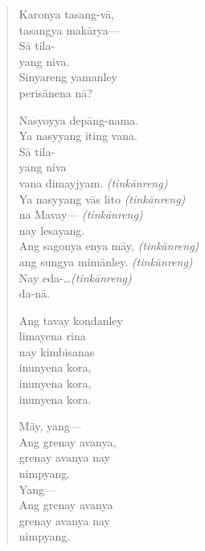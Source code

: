 \documentclass[12pt,paper=a4]{scrartcl}
\begin{document}
\begin{quote}
\begin{multicols}{2}
Karonya tasang-vā,\\
tasangya makārya---\\
Sā tila-\\
yang niva.\\
Sinyareng yamanley\\
perisānena nā?

Nasyoyya depāng-nama.\\
Ya nasyyang iting vana.\\
Sā tila-\\
yang niva\\
vana dimayjyam.			\tab \textit{(tinkānreng)}\\
Ya nasyyang vās lito	\tab \textit{(tinkānreng)}\\
na Mavay---				\tab \textit{(tinkānreng)}\\
nay lesayang.\\
Ang sagonya enya māy,	\tab \textit{(tinkānreng)}\\
ang sungya mimānley.	\tab \textit{(tinkānreng)}\\
Nay eda-\dots			\tab \textit{(tinkānreng)}\\
da-nā.

\columnbreak

Ang tavay kondanley\\
limayena rina\\
nay kimbisanas\\
inunyena kora,\\
inunyena kora,\\
inunyena kora.

Māy, yang---\\
Ang grenay avanya,\\
grenay avanya nay\\
nimpyang.\\
Yang---\\
Ang grenay avanya\\
grenay avanya nay\\
nimpyang.
\end{multicols}



\end{quote}
\end{document}
